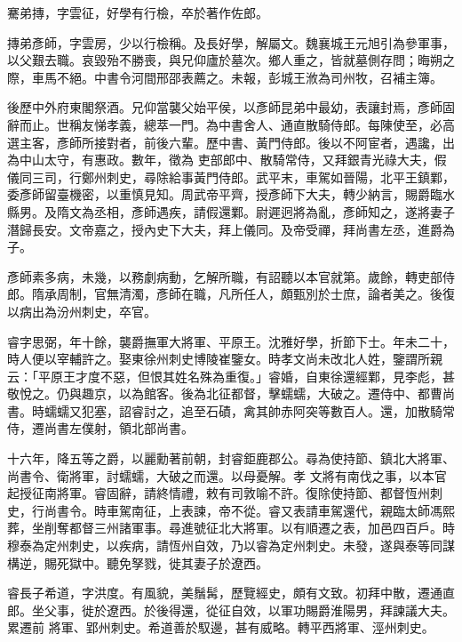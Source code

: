 \begin{pinyinscope}
 騫弟摶，字雲征，好學有行檢，卒於著作佐郎。



 摶弟彥師，字雲房，少以行檢稱。及長好學，解屬文。魏襄城王元旭引為參軍事，以父艱去職。哀毀殆不勝喪，與兄仰廬於墓次。鄉人重之，皆就墓側存問；晦朔之際，車馬不絕。中書令河間邢邵表薦之。未報，彭城王浟為司州牧，召補主簿。



 後歷中外府東閣祭酒。兄仰當襲父始平侯，以彥師昆弟中最幼，表讓封焉，彥師固辭而止。世稱友悌孝義，總萃一門。為中書舍人、通直散騎侍郎。每陳使至，必高選主客，彥師所接對者，前後六輩。歷中書、黃門侍郎。後以不阿宦者，遇讒，出為中山太守，有惠政。數年，徵為
 吏部郎中、散騎常侍，又拜銀青光祿大夫，假儀同三司，行鄭州刺史，尋除給事黃門侍郎。武平末，車駕如晉陽，北平王鎮鄴，委彥師留臺機密，以重慎見知。周武帝平齊，授彥師下大夫，轉少納言，賜爵臨水縣男。及隋文為丞相，彥師遇疾，請假還鄴。尉遲迥將為亂，彥師知之，遂將妻子潛歸長安。文帝嘉之，授內史下大夫，拜上儀同。及帝受禪，拜尚書左丞，進爵為子。



 彥師素多病，未幾，以務劇病動，乞解所職，有詔聽以本官就第。歲餘，轉吏部侍郎。隋承周制，官無清濁，彥師在職，凡所任人，頗甄別於士庶，論者美之。後復以病出為汾州刺史，卒官。



 睿字思弼，年十餘，襲爵撫軍大將軍、平原王。沈雅好學，折節下士。年未二十，時人便以宰輔許之。娶東徐州刺史博陵崔鑒女。時孝文尚未改北人姓，鑒謂所親云：「平原王才度不惡，但恨其姓名殊為重復。」睿婚，自東徐還經鄴，見李彪，甚敬悅之。仍與趣京，以為館客。後為北征都督，擊蠕蠕，大破之。遷侍中、都曹尚書。時蠕蠕又犯塞，詔睿討之，追至石磧，禽其帥赤阿突等數百人。還，加散騎常侍，遷尚書左僕射，領北部尚書。



 十六年，降五等之爵，以麗勳著前朝，封睿鉅鹿郡公。尋為使持節、鎮北大將軍、尚書令、衛將軍，討蠕蠕，大破之而還。以母憂解。孝
 文將有南伐之事，以本官起授征南將軍。睿固辭，請終情禮，敕有司敦喻不許。復除使持節、都督恆州刺史，行尚書令。時車駕南征，上表諫，帝不從。睿又表請車駕還代，親臨太師馮熙葬，坐削奪都督三州諸軍事。尋進號征北大將軍。以有順遷之表，加邑四百戶。時穆泰為定州刺史，以疾病，請恆州自效，乃以睿為定州刺史。未發，遂與泰等同謀構逆，賜死獄中。聽免孥戮，徙其妻子於遼西。



 睿長子希道，字洪度。有風貌，美鬚髯，歷覽經史，頗有文致。初拜中散，遷通直郎。坐父事，徙於遼西。於後得還，從征自效，以軍功賜爵淮陽男，拜諫議大夫。累遷前
 將軍、郢州刺史。希道善於馭邊，甚有威略。轉平西將軍、涇州刺史。




\end{pinyinscope}
